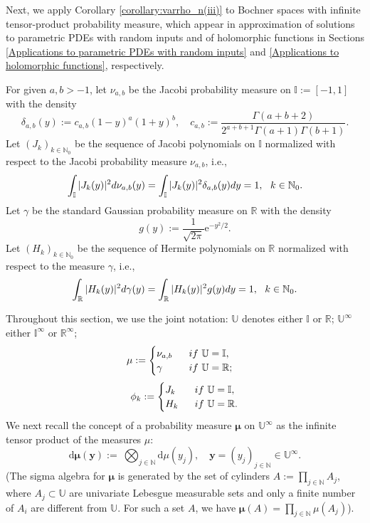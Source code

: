 \documentclass[11pt]{article}
\numberwithin{equation}{section}
\theoremstyle{definition}
\theoremstyle{remark}
\newcommand{\by}{{\boldsymbol{y}}}
\newcommand{\bmu}{{\boldsymbol{\mu}}}
\newcommand{\rd}{{\rm d}}
\def\II{\mathbb I}
\def\RR{{\mathbb R}}
\def\NN{{\mathbb N}}
\def\II{{\mathbb I}}
\def\NN{{\mathbb N}}
\def\RR{{\mathbb R}}
\def\UU{{\mathbb U}}
\def\IIi{{\mathbb I}^\infty}
\def\UUi{{\mathbb U}^{\infty}}
\def\II{{\mathbb I}}
\def\NN{{\mathbb N}}
\def\RRR{{\mathbb R}}
\def\RRRi{{\mathbb R}^\infty}
\begin{document}
 
Next, we apply Corollary \ref{corollary:varrho_n(iii)} to Bochner spaces with infinite tensor-product probability measure, which {appear in approximation  of solutions to} parametric PDEs with random inputs and of holomorphic functions in Sections 
 \ref{Applications to parametric PDEs with random inputs} and 
 \ref{Applications to holomorphic functions}, respectively.

 For given $a,b > -1$, let $\nu_{a,b}$ be the Jacobi probability measure on $\II:= [-1,1]$ 
 with the density 
 \begin{equation*} \label{delta_ab}
 	\delta_{a,b}(y):=c_{a,b}(1-y)^a(1+y)^b, \quad
 	c_{a,b}:=\frac{\Gamma(a+b+2)}{2^{a+b+1}\Gamma(a+1)\Gamma(b+1)}.
 \end{equation*}
 Let $(J_k)_{k\in \NN_0}$ be the sequence of Jacobi polynomials on $\II$ 
 normalized with respect to the Jacobi probability measure $\nu_{a,b}$, i.e., 
 $$
 \int_{\II} |J_k(y)|^2 \rd \nu_{a,b}(y) =\int_{\II} |J_k(y)|^2 \delta_{a,b}(y) \rd y =1, \ \
 k\in \NN_0.
 $$
 Let $\gamma$ be the standard Gaussian probability measure on $\RR$ 
 with the density 
 \begin{equation*} \label{g}
 	g(y):=\frac 1 {\sqrt{2\pi}} \mathrm e^{-y^2/2} .
 \end{equation*}
 Let $(H_k)_{k\in \NN_0}$ be the sequence of Hermite polynomials on $\RRR$ 
 normalized with respect to the measure $\gamma$, i.e., 
 $$
 \int_{\RR} |H_k(y)|^2 \rd \gamma(y) =\int_{{\RR}} |H_k(y)|^2 g(y) \rd y =1, \ \
 k\in \NN_0.
 $$
 
 Throughout this section, we use the joint notation: $\UU$ denotes either $\II$ or $\RR$; $\UUi$ either $\IIi$ or $\RRRi$;
 \begin{equation} \nonumber
 	\mu
 	:=
 	\begin{cases}
 		\nu_{a,b}\ \ &{\rm if} \ \UU=\II, \\
 		\gamma\ \ &{\rm if} \ \UU=\RR;
 	\end{cases}
 	\quad
 \end{equation}
 \begin{equation} \nonumber
 	\phi_k
 	:=
 	\begin{cases}
 		J_{{k}}\ \ &{\rm if} \ \UU=\II, \\
 		H_{{k}}\ \ &{\rm if} \ \UU=\RR.
 	\end{cases}
 \end{equation}
 We next recall {the} concept of
 a probability measure $\bmu$ on $\UUi$ as 
 the infinite tensor product of the 
 measures $\mu$:
 \begin{equation} \nonumber
    \mathrm d\bmu(\by) 
 	:= \ 
    \bigotimes_{j \in \NN} \mathrm d \mu(y_j) , \quad \by = (y_j)_{j \in \NN} \in \UUi.
 \end{equation}
 (The sigma algebra for $\bmu$ is generated by the set of cylinders $A:= \prod_{j \in \NN} A_j$, where $A_j \subset \UU$ are univariate Lebesgue measurable sets and only a finite number of $A_i$ are different from $\UU$. For such a set $A$, we have $\bmu(A) = \prod_{j \in \NN} \mu(A_j)$).
 
\end{document}
